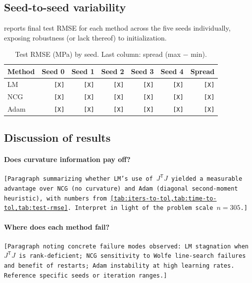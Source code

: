 \documentclass[11pt,letterpaper]{article}
\newcommand{\T}{^{\mathsf{T}}}
\theoremstyle{definition}
\begin{document}
\subsection{Seed-to-seed variability}
 
 reports final test RMSE for each method across the
five seeds individually, exposing robustness (or lack thereof) to
initialization.
 
\begin{table}[H]
\centering
\small
\caption{Test RMSE (MPa) by seed. Last column: spread (max $-$ min).}
\label{tab:seed-spread}
\begin{tabular}{@{}lrrrrrr@{}}
\toprule
Method & Seed 0 & Seed 1 & Seed 2 & Seed 3 & Seed 4 & Spread \\
\midrule
LM   & \texttt{[X]} & \texttt{[X]} & \texttt{[X]} & \texttt{[X]} & \texttt{[X]} & \texttt{[X]} \\
NCG  & \texttt{[X]} & \texttt{[X]} & \texttt{[X]} & \texttt{[X]} & \texttt{[X]} & \texttt{[X]} \\
Adam & \texttt{[X]} & \texttt{[X]} & \texttt{[X]} & \texttt{[X]} & \texttt{[X]} & \texttt{[X]} \\
\bottomrule
\end{tabular}
\end{table}
 
\subsection{Discussion of results}
\label{sec:discussion}
 
\paragraph{Does curvature information pay off?}
\texttt{[Paragraph summarizing whether LM's use of $J\T J$ yielded a
measurable advantage over NCG (no curvature) and Adam (diagonal
second-moment heuristic), with numbers from
\cref{tab:iters-to-tol,tab:time-to-tol,tab:test-rmse}. Interpret in light
of the problem scale $n = 305$.]}
 
\paragraph{Where does each method fail?}
\texttt{[Paragraph noting concrete failure modes observed: LM stagnation
when $J\T J$ is rank-deficient; NCG sensitivity to Wolfe line-search
failures and benefit of restarts; Adam instability at high learning rates.
Reference specific seeds or iteration ranges.]}
 
\end{document}
